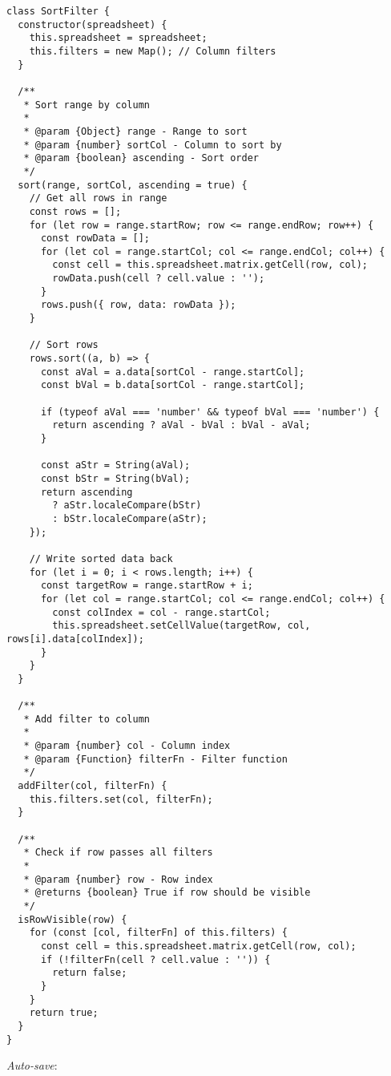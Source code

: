 \documentclass[11pt]{article}
\begin{document}
\begin{verbatim}
class SortFilter {
  constructor(spreadsheet) {
    this.spreadsheet = spreadsheet;
    this.filters = new Map(); // Column filters
  }
  
  /**
   * Sort range by column
   * 
   * @param {Object} range - Range to sort
   * @param {number} sortCol - Column to sort by
   * @param {boolean} ascending - Sort order
   */
  sort(range, sortCol, ascending = true) {
    // Get all rows in range
    const rows = [];
    for (let row = range.startRow; row <= range.endRow; row++) {
      const rowData = [];
      for (let col = range.startCol; col <= range.endCol; col++) {
        const cell = this.spreadsheet.matrix.getCell(row, col);
        rowData.push(cell ? cell.value : '');
      }
      rows.push({ row, data: rowData });
    }
    
    // Sort rows
    rows.sort((a, b) => {
      const aVal = a.data[sortCol - range.startCol];
      const bVal = b.data[sortCol - range.startCol];
      
      if (typeof aVal === 'number' && typeof bVal === 'number') {
        return ascending ? aVal - bVal : bVal - aVal;
      }
      
      const aStr = String(aVal);
      const bStr = String(bVal);
      return ascending
        ? aStr.localeCompare(bStr)
        : bStr.localeCompare(aStr);
    });
    
    // Write sorted data back
    for (let i = 0; i < rows.length; i++) {
      const targetRow = range.startRow + i;
      for (let col = range.startCol; col <= range.endCol; col++) {
        const colIndex = col - range.startCol;
        this.spreadsheet.setCellValue(targetRow, col, rows[i].data[colIndex]);
      }
    }
  }
  
  /**
   * Add filter to column
   * 
   * @param {number} col - Column index
   * @param {Function} filterFn - Filter function
   */
  addFilter(col, filterFn) {
    this.filters.set(col, filterFn);
  }
  
  /**
   * Check if row passes all filters
   * 
   * @param {number} row - Row index
   * @returns {boolean} True if row should be visible
   */
  isRowVisible(row) {
    for (const [col, filterFn] of this.filters) {
      const cell = this.spreadsheet.matrix.getCell(row, col);
      if (!filterFn(cell ? cell.value : '')) {
        return false;
      }
    }
    return true;
  }
}
\end{verbatim}

\emph{Auto-save}:
\end{document}
